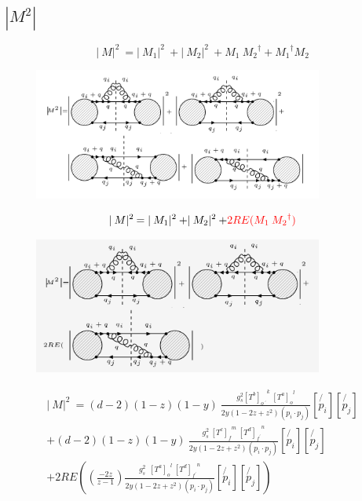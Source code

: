 \subsection{$|M^{2}|$}
\begin{equation}
\lvert\:M\lvert^2\: = \lvert\:M_1\lvert^2\:+\lvert\:M_2\lvert^2\:+ M_1\: {M_2}^{\dagger} +{M_1}^{\dagger} M_2
\end{equation}
\begin{figure}[h!]
\centering
\includegraphics[width=0.85\textwidth]{images/qqgMSquer.png}
\end{figure}
\begin{equation}
\lvert\:M\lvert^2\: = \lvert\:M_1\lvert^2\:+\lvert\:M_2\lvert^2\:+ {\color[RGB]{255,0,0} 2RE(M_1\: {M_2}^{\dagger})}
\end{equation}
\begin{figure}[h!]
\centering
\includegraphics[width=0.85\textwidth]{images/REqqgMSquer.png}
\end{figure}
\begin{equation}
\begin{split}
\lvert\:M\lvert^2\: = (d-2)(1-z)(1-y)\:\frac{g_s^2  {[T^b]_{o\:^{\prime}}}^k \: {[T^a]_o}^l }{2y(1-2z+z^2)(p_i \cdot p_j)}
[\not{p_i}][\not{p_j}]\\
+(d-2)(1-z)(1-y)\:\frac{g_s^2 \: {[T^c]_f}^m \: {[T^d]_{f^{\prime}}}^n }{2y(1-2z+z^2)(p_i \cdot p_j)}
[\not{p_i}][\not{p_j}]\\
+2RE((\frac{-2z}{z-1}) \frac{g_s^2 \:\:{[T^a]_o}^l \:{[T^d]_{f^{\prime}}}^n }{2y(1-2z+z^2)(p_i \cdot p_j)} 
[\not{p_i}][\not{p_j}])
\end{split}
\end{equation}
\newpage